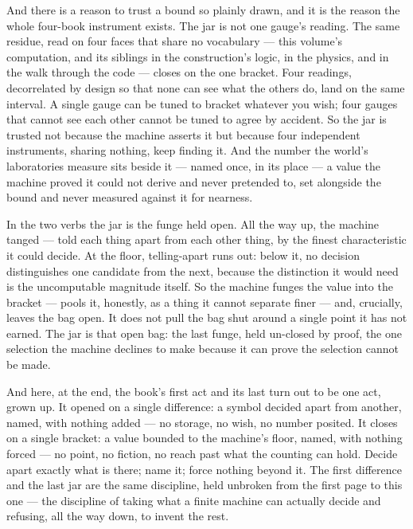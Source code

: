 And there is a reason to trust a bound so plainly drawn, and it is the reason the whole four-book instrument exists. The
jar is not one gauge's reading. The same residue, read on four faces that share no vocabulary --- this volume's
computation, and its siblings in the construction's logic, in the physics, and in the walk through the code --- closes on
the one bracket. Four readings, decorrelated by design so that none can see what the others do, land on the same interval.
A single gauge can be tuned to bracket whatever you wish; four gauges that cannot see each other cannot be tuned to agree
by accident. So the jar is trusted not because the machine asserts it but because four independent instruments, sharing
nothing, keep finding it. And the number the world's laboratories measure sits beside it --- named once, in its place ---
a value the machine proved it could not derive and never pretended to, set alongside the bound and never measured against
it for nearness.

In the two verbs the jar is the funge held open. All the way up, the machine tanged --- told each thing apart from each
other thing, by the finest characteristic it could decide. At the floor, telling-apart runs out: below it, no decision
distinguishes one candidate from the next, because the distinction it would need is the uncomputable magnitude itself. So
the machine funges the value into the bracket --- pools it, honestly, as a thing it cannot separate finer --- and,
crucially, leaves the bag open. It does not pull the bag shut around a single point it has not earned. The jar is that
open bag: the last funge, held un-closed by proof, the one selection the machine declines to make because it can prove the
selection cannot be made.

And here, at the end, the book's first act and its last turn out to be one act, grown up. It opened on a single
difference: a symbol decided apart from another, named, with nothing added --- no storage, no wish, no number posited. It
closes on a single bracket: a value bounded to the machine's floor, named, with nothing forced --- no point, no fiction,
no reach past what the counting can hold. Decide apart exactly what is there; name it; force nothing beyond it. The first
difference and the last jar are the same discipline, held unbroken from the first page to this one --- the discipline of
taking what a finite machine can actually decide and refusing, all the way down, to invent the rest.

